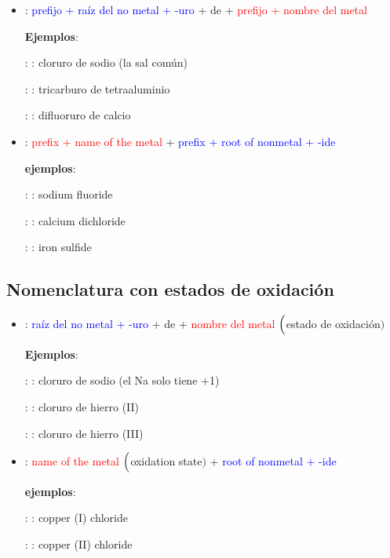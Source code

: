 \begin{itemize}
    \item \noindent{}: \textcolor{blue}{prefijo + raíz del no metal + -uro} + de + \textcolor{red}{prefijo + nombre del metal}

    \textbf{Ejemplos}:

    : : cloruro de sodio (la sal común)

    : : tricarburo de tetraaluminio

    : : difluoruro de calcio


    \item \noindent{}: \textcolor{red}{prefix + name of the metal} + \textcolor{blue}{prefix + root of nonmetal + -ide}

    \textbf{ejemplos}:

    : : sodium fluoride

    : : calcium dichloride

    : : iron sulfide
\end{itemize}

\subsection{Nomenclatura con estados de oxidación}

\begin{itemize}
    \item \noindent{}: \textcolor{blue}{raíz del no metal + -uro} + de + \textcolor{red}{nombre del metal} $\Bigl($\textcolor{green!50!black}{estado de oxidación}$\Bigr)$

    \textbf{Ejemplos}:

    : : cloruro de sodio (el Na solo tiene +1)

    : : cloruro de hierro (II)

    : : cloruro de hierro (III)


    \item \noindent{}: \textcolor{red}{name of the metal} $\Bigl($\textcolor{green!50!black}{oxidation state}$\Bigr)$ + \textcolor{blue}{root of nonmetal + -ide}

    \textbf{ejemplos}:

    : : copper (I) chloride

    : : copper (II) chloride
\end{itemize}


